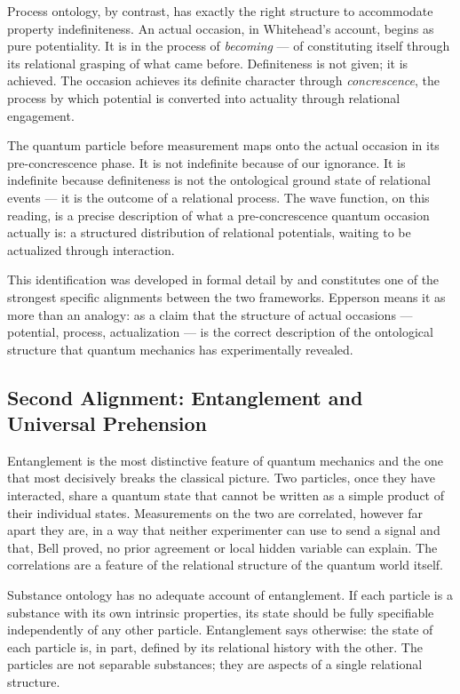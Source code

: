 Process ontology, by contrast, has exactly the right structure to accommodate
property indefiniteness.
An actual occasion, in Whitehead's account, begins as pure potentiality.
It is in the process of \emph{becoming} --- of constituting itself through its
relational grasping of what came before.
Definiteness is not given; it is achieved.
The occasion achieves its definite character through \emph{concrescence}, the
process by which potential is converted into actuality through relational
engagement.

The quantum particle before measurement maps onto the actual occasion in its
pre-concrescence phase.
It is not indefinite because of our ignorance.
It is indefinite because definiteness is not the ontological ground state of
relational events --- it is the outcome of a relational process.
The wave function, on this reading, is a precise description of what a
pre-concrescence quantum occasion actually is: a structured distribution of
relational potentials, waiting to be actualized through interaction.

This identification was developed in formal detail by \citet{Epperson2004} and
constitutes one of the strongest specific alignments between the two frameworks.
Epperson means it as more than an analogy: as a claim that the structure of
actual occasions --- potential, process, actualization --- is the correct
description of the ontological structure that quantum mechanics has
experimentally revealed.

\subsection*{Second Alignment: Entanglement and Universal Prehension}

Entanglement is the most distinctive feature of quantum mechanics and the one
that most decisively breaks the classical picture.
Two particles, once they have interacted, share a quantum state that cannot be
written as a simple product of their individual states.
Measurements on the two are correlated, however far apart they are, in a way
that neither experimenter can use to send a signal and that, Bell proved, no
prior agreement or local hidden variable can explain.
The correlations are a feature of the relational structure of the quantum world
itself.

Substance ontology has no adequate account of entanglement.
If each particle is a substance with its own intrinsic properties, its state
should be fully specifiable independently of any other particle.
Entanglement says otherwise: the state of each particle is, in part, defined by
its relational history with the other.
The particles are not separable substances; they are aspects of a single
relational structure.

